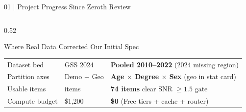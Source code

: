 \documentclass[10pt,aspectratio=169]{beamer}
\begin{document}
\begin{frame}{01 | Project Progress Since Zeroth Review}
\begin{columns}[T]
\begin{column}{0.52\textwidth}
\begin{block}{Where Real Data Corrected Our Initial Spec}
\begin{tabularx}{\textwidth}{@{} >{\raggedright\arraybackslash}p{2.3cm} >{\raggedright\arraybackslash}p{1.7cm} X @{}}
                    Dataset bed & GSS 2024 & \textbf{Pooled 2010--2022} (2024 missing region) \\
                    \rowcolor{RowAlt} Partition axes & Demo + Geo & \textbf{Age $\times$ Degree $\times$ Sex} (geo in stat card) \\
                    Usable items & 148 items & \textbf{74 items} clear SNR $\ge 1.5$ gate \\
                    \rowcolor{RowAlt} Compute budget & \$1,200 & \textbf{\$0} (Free tiers + cache + router) \\
                    \bottomrule
                \end{tabularx}
            \end{block}
        \end{column}
    \end{columns}
\end{frame}
\end{document}
